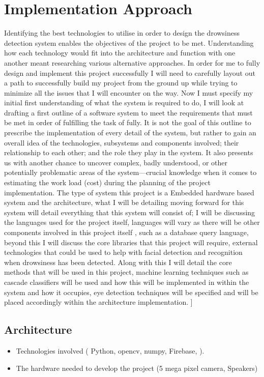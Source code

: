\chapter{Implementation Approach}
\label{chap:implementation}
\usepackage{graphicsx}

Identifying the best technologies to utilise in order to design the drowsiness detection system enables the objectives of the project to be met.  Understanding how each technology would fit into the architecture and function with one another meant researching various alternative approaches. In order for me to fully design and implement this project successfully I will need to carefully layout out a path to successfully build my project from the ground up while trying to minimize all the issues that I will encounter on the way.
Now I must specify my initial first understanding of what the system is required to do, I will look at drafting a first outline of a software system to meet the requirements that must be met in order of fulfilling the task of fully. It is not the goal of this outline to prescribe the implementation of every detail of the system, but rather to gain an overall idea of the technologies, subsystems and components involved; their relationship to each other; and the role they play in the system. It also presents us with another chance to uncover complex, badly understood, or other potentially problematic areas of the system—crucial knowledge when it comes to estimating the work load (cost) during the planning of the project implementation.
The type of system this project is a Embedded hardware based system and the architecture, what I will be detailing moving forward for this system will detail everything that this system will consist of; I will be discussing the languages used for the project itself, languages will vary as there will be other components involved in this project itself , such as a database query language, beyond this I will discuss the core libraries that this project will require, external technologies that could be used to help with facial detection and recognition when drowsiness has been detected. Along with this I will detail the core methods that will be used in this project, machine learning techniques such as cascade classifiers will be used and how this will be implemented in within the system and how it occupies, eye detection techniques will be specified and will be placed accordingly within the architecture implementation.
 ]
\section{Architecture} \label{sec:Arch}
\begin{itemize}
    \item Technologies involved ( Python, opencv, numpy, Firebase, ). 
    \item The hardware needed to develop the project (5 mega pixel camera, Speakers)
\end{itemize}
